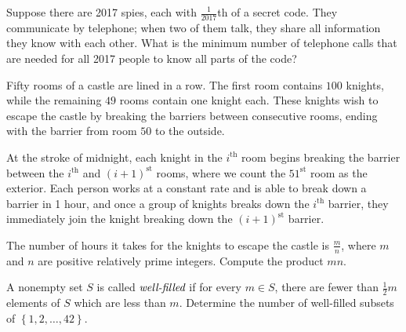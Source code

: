 \documentclass[mast]{lucky}
\begin{document}
\begin{prob}[BMT 2018]{3}
Suppose there are 2017 spies, each with $\frac{1}{2017}$th of a secret code. They communicate by telephone; when two of them talk, they share all information they know with each other. What is the minimum number of telephone calls that are needed for all 2017 people to know all parts of the
code?
\end{prob}

\begin{prob}{3}
Fifty rooms of a castle are lined in a row.  The first room contains $100$ knights, while the remaining $49$ rooms contain one knight each.  These knights wish to escape the castle by breaking the barriers between consecutive rooms, ending with the barrier from room $50$ to the outside.

\noindent At the stroke of midnight, each knight in the $i^{\text{th}}$ room begins breaking the barrier between the $i^{\text{th}}$ and $(i+1)^{\text{st}}$ rooms, where we count the $51^{\text{st}}$ room as the exterior.  Each person works at a constant rate and is able to break down a barrier in 1 hour, and once a group of knights breaks down the $i^{\text{th}}$ barrier, they immediately join the knight breaking down the $(i+1)^{\text{st}}$ barrier.

\noindent The number of hours it takes for the knights to escape the castle is $\tfrac mn$, where $m$ and $n$ are positive relatively prime integers.  Compute the product $mn$.
\end{prob}

\begin{prob}[HMMT 2016 T6]{13}
A nonempty set $S$ is called $\emph{well-filled}$ if for every $m \in S$, there are fewer than $\frac 12 m$ elements of $S$ which are less than $m$. Determine the number of well-filled subsets of $\left\{ 1,2,\dots,42 \right\}$.
\end{prob}
\end{document}

